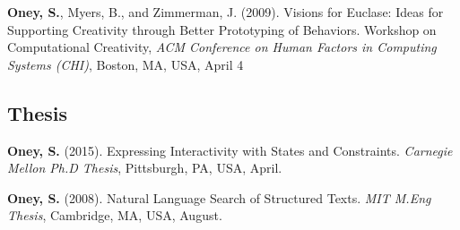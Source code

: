  {
\textbf{Oney, S.}, Myers, B., and Zimmerman, J. (2009). Visions for Euclase: Ideas for Supporting Creativity through Better Prototyping of Behaviors. Workshop on Computational Creativity, \textit{ACM Conference on Human Factors in Computing Systems (CHI)}, Boston, MA, USA, April 4
}

\subsection{Thesis}

 {
\textbf{Oney, S.} (2015). Expressing Interactivity with States and Constraints. \textit{Carnegie Mellon Ph.D Thesis}, Pittsburgh, PA, USA, April.
}

 {
\textbf{Oney, S.} (2008). Natural Language Search of Structured Texts. \textit{MIT M.Eng Thesis}, Cambridge, MA, USA, August.
}
